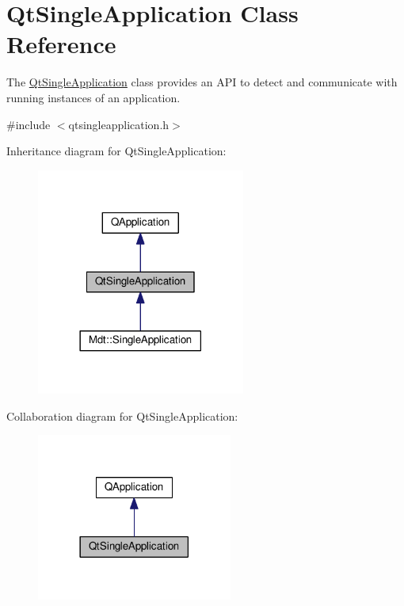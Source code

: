 \hypertarget{class_qt_single_application}{}\section{Qt\+Single\+Application Class Reference}
\label{class_qt_single_application}


The \hyperlink{class_qt_single_application}{Qt\+Single\+Application} class provides an A\+PI to detect and communicate with running instances of an application.  




{\ttfamily \#include $<$qtsingleapplication.\+h$>$}



Inheritance diagram for Qt\+Single\+Application\+:
\nopagebreak
\begin{figure}[H]
\begin{center}
\leavevmode
\includegraphics[width=194pt]{class_qt_single_application__inherit__graph}
\end{center}
\end{figure}


Collaboration diagram for Qt\+Single\+Application\+:\nopagebreak
\begin{figure}[H]
\begin{center}
\leavevmode
\includegraphics[width=182pt]{class_qt_single_application__coll__graph}
\end{center}
\end{figure}
